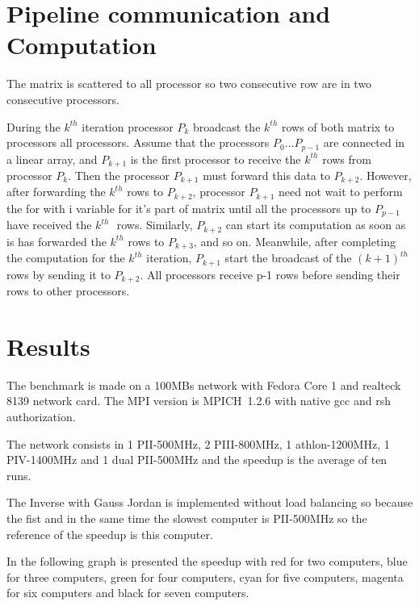 \documentclass[a4paper]{article}
\begin{document}
\section{Pipeline communication and Computation}

\bigskip The matrix is scattered to all processor so two consecutive row are
in two consecutive processors.

During the $k^{th}$ iteration processor $P_{k}$ broadcast the $k^{th}$ rows
of both matrix to processors all processors. Assume that the processors $%
P_{0}...P_{p-1}$ are connected in a linear array, and $P_{k+1}$ is the first
processor to receive the $k^{th}$ rows from processor $P_{k}$. Then the
processor $P_{k+1}$ must forward this data to $P_{k+2}$. However, after
forwarding the $k^{th}$ rows to $P_{k+2}$, processor $P_{k+1}$ need not wait
to perform the for with i variable for it's part of matrix until all the
processors up to $P_{p-1}$ have received the $k^{th}\,$\ rows. Similarly, $%
P_{k+2}$ can start its computation as soon as is has forwarded the $k^{th}$
rows to $P_{k+3}$, and so on. Meanwhile, after completing the computation
for the $k^{th}$ iteration, $P_{k+1}$ start the broadcast of the $(k+1)^{th}$
rows by sending it to $P_{k+2}$. All processors receive p-1 rows before
sending their rows to other processors.

\section{\protect\bigskip Results}

The benchmark is made on a 100MBs network with Fedora Core 1 and realteck
8139 network card. The MPI version is MPICH\ 1.2.6 with native gcc and rsh
authorization.

The network consists in 1 PII-500MHz, 2 PIII-800MHz, 1 athlon-1200MHz, 1
PIV-1400MHz and 1 dual PII-500MHz and the speedup is the average of ten runs.

The Inverse with Gauss Jordan is implemented without load balancing so
because the fist and in the same time the slowest computer is PII-500MHz so
the reference of the speedup is this computer.

In the following graph is presented the speedup with red for two computers,
blue for three computers, green for four computers, cyan for five computers,
magenta for six computers and black for seven computers.

\begin{center}
\end{center}
\end{document}
